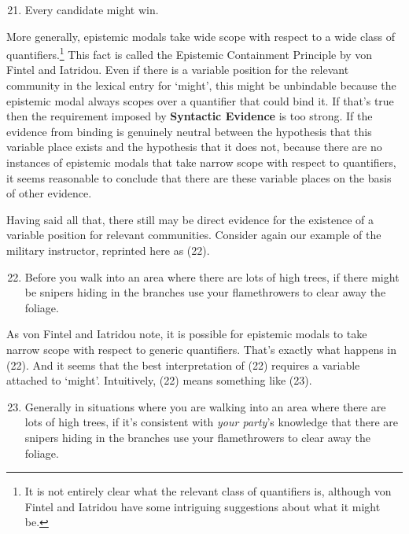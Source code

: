 \begin{enumerate}
\setcounter{enumi}{20} 
\item Every candidate might win. 
\end{enumerate}

\noindent More generally, epistemic modals take wide scope with respect to a wide class of quantifiers.\footnote{It is not entirely clear what the relevant class of quantifiers is, although von Fintel and Iatridou have some intriguing suggestions about what it might be.} This fact is called the Epistemic Containment Principle by von Fintel and Iatridou. Even if there is a variable position for the relevant community in the lexical entry for `might', this might be unbindable because the epistemic modal always scopes over a quantifier that could bind it. If that's true then the requirement imposed by \textbf{Syntactic Evidence} is too strong. If the evidence from binding is genuinely neutral between the hypothesis that this variable place exists and the hypothesis that it does not, because there are no instances of epistemic modals that take narrow scope with respect to quantifiers, it seems reasonable to conclude that there are these variable places on the basis of other evidence.
 
Having said all that, there still may be direct evidence for the existence of a variable position for relevant communities. Consider again our example of the military instructor, reprinted here as (22).
 
\begin{enumerate}
\setcounter{enumi}{21} 
\item Before you walk into an area where there are lots of high trees, if there might be snipers hiding in the branches use your flamethrowers to clear away the foliage.
 \end{enumerate}

\noindent As von Fintel and Iatridou note, it is possible for epistemic modals to take narrow scope with respect to generic quantifiers. That's exactly what happens in (22). And it seems that the best interpretation of (22) requires a variable attached to `might'. Intuitively, (22) means something like (23).
 
\begin{enumerate}
\setcounter{enumi}{22} 
\item Generally in situations where you are walking into an area where there are lots of high trees, if it's consistent with \textit{your party}'s knowledge that there are snipers hiding in the branches use your flamethrowers to clear away the foliage.
\end{enumerate}

